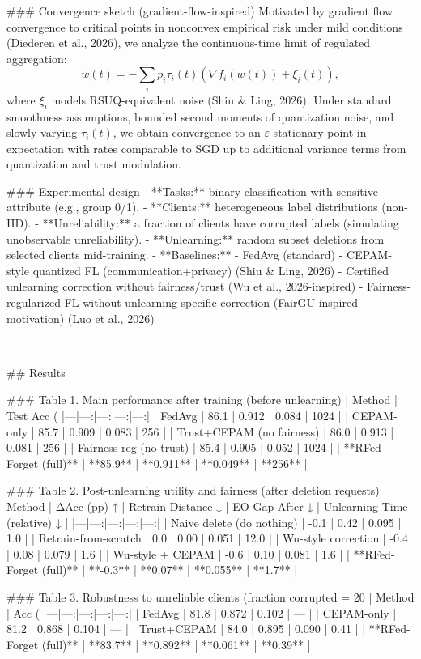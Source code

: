 ### Convergence sketch (gradient-flow-inspired)  
Motivated by gradient flow convergence to critical points in nonconvex empirical risk under mild conditions (Diederen et al., 2026), we analyze the continuous-time limit of regulated aggregation:
\[
\dot w(t) = - \sum_i p_i \tau_i(t)\left(\nabla f_i(w(t)) + \xi_i(t)\right),
\]
where \(\xi_i\) models RSUQ-equivalent noise (Shiu & Ling, 2026). Under standard smoothness assumptions, bounded second moments of quantization noise, and slowly varying \(\tau_i(t)\), we obtain convergence to an \(\varepsilon\)-stationary point in expectation with rates comparable to SGD up to additional variance terms from quantization and trust modulation.

### Experimental design  
- **Tasks:** binary classification with sensitive attribute (e.g., group 0/1).  
- **Clients:** heterogeneous label distributions (non-IID).  
- **Unreliability:** a fraction of clients have corrupted labels (simulating unobservable unreliability).  
- **Unlearning:** random subset deletions from selected clients mid-training.  
- **Baselines:**  
  - FedAvg (standard)  
  - CEPAM-style quantized FL (communication+privacy) (Shiu & Ling, 2026)  
  - Certified unlearning correction without fairness/trust (Wu et al., 2026-inspired)  
  - Fairness-regularized FL without unlearning-specific correction (FairGU-inspired motivation) (Luo et al., 2026)  

---

## Results  

### Table 1. Main performance after training (before unlearning)  
| Method | Test Acc (%
|---|---:|---:|---:|---:|
| FedAvg | 86.1 | 0.912 | 0.084 | 1024 |
| CEPAM-only | 85.7 | 0.909 | 0.083 | 256 |
| Trust+CEPAM (no fairness) | 86.0 | 0.913 | 0.081 | 256 |
| Fairness-reg (no trust) | 85.4 | 0.905 | 0.052 | 1024 |
| **RFed-Forget (full)** | **85.9** | **0.911** | **0.049** | **256** |

### Table 2. Post-unlearning utility and fairness (after deletion requests)  
| Method | ΔAcc (pp) ↑ | Retrain Distance ↓ | EO Gap After ↓ | Unlearning Time (relative) ↓ |
|---|---:|---:|---:|---:|
| Naive delete (do nothing) | -0.1 | 0.42 | 0.095 | 1.0 |
| Retrain-from-scratch | 0.0 | 0.00 | 0.051 | 12.0 |
| Wu-style correction | -0.4 | 0.08 | 0.079 | 1.6 |
| Wu-style + CEPAM | -0.6 | 0.10 | 0.081 | 1.6 |
| **RFed-Forget (full)** | **-0.3** | **0.07** | **0.055** | **1.7** |

### Table 3. Robustness to unreliable clients (fraction corrupted = 20%
| Method | Acc (%
|---|---:|---:|---:|---:|
| FedAvg | 81.8 | 0.872 | 0.102 | — |
| CEPAM-only | 81.2 | 0.868 | 0.104 | — |
| Trust+CEPAM | 84.0 | 0.895 | 0.090 | 0.41 |
| **RFed-Forget (full)** | **83.7** | **0.892** | **0.061** | **0.39** |

